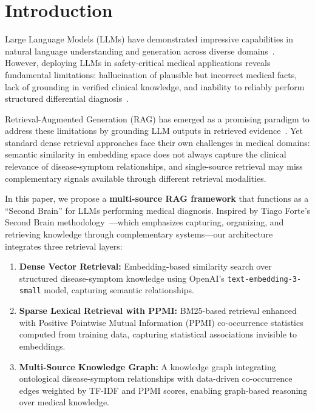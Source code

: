 \documentclass[review]{elsarticle}
\begin{document}
\section{Introduction}
\label{sec:introduction}

Large Language Models (LLMs) have demonstrated impressive capabilities in natural language understanding and generation across diverse domains~\cite{brown2020language,openai2023gpt4}. However, deploying LLMs in safety-critical medical applications reveals fundamental limitations: hallucination of plausible but incorrect medical facts, lack of grounding in verified clinical knowledge, and inability to reliably perform structured differential diagnosis~\cite{ji2023survey,singhal2023large}.

Retrieval-Augmented Generation (RAG) has emerged as a promising paradigm to address these limitations by grounding LLM outputs in retrieved evidence~\cite{lewis2020retrieval,gao2023retrieval}. Yet standard dense retrieval approaches face their own challenges in medical domains: semantic similarity in embedding space does not always capture the clinical relevance of disease-symptom relationships, and single-source retrieval may miss complementary signals available through different retrieval modalities.

In this paper, we propose a \textbf{multi-source RAG framework} that functions as a ``Second Brain'' for LLMs performing medical diagnosis. Inspired by Tiago Forte's Second Brain methodology~\cite{forte2022building}---which emphasizes capturing, organizing, and retrieving knowledge through complementary systems---our architecture integrates three retrieval layers:

\begin{enumerate}
    \item \textbf{Dense Vector Retrieval:} Embedding-based similarity search over structured disease-symptom knowledge using OpenAI's \texttt{text-embedding-3-small} model, capturing semantic relationships.
    \item \textbf{Sparse Lexical Retrieval with PPMI:} BM25-based retrieval enhanced with Positive Pointwise Mutual Information (PPMI) co-occurrence statistics computed from training data, capturing statistical associations invisible to embeddings.
    \item \textbf{Multi-Source Knowledge Graph:} A knowledge graph integrating ontological disease-symptom relationships with data-driven co-occurrence edges weighted by TF-IDF and PPMI scores, enabling graph-based reasoning over medical knowledge.
\end{enumerate}
\end{document}
